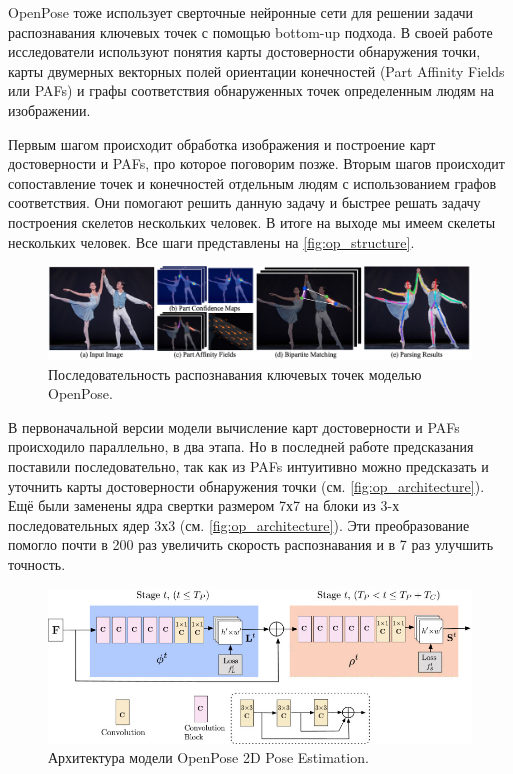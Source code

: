 OpenPose тоже использует сверточные нейронные сети для решении задачи распознавания ключевых точек с помощью bottom-up подхода. В своей работе исследователи используют понятия карты достоверности обнаружения точки, карты двумерных векторных полей ориентации конечностей (Part Affinity Fields или PAFs) и графы соответствия обнаруженных точек определенным людям на изображении.

Первым шагом происходит обработка изображения и построение карт достоверности и PAFs, про которое поговорим позже. Вторым шагов происходит сопоставление точек и конечностей отдельным людям с использованием графов соответствия. Они помогают решить данную задачу и быстрее решать задачу построения скелетов нескольких человек. В итоге на выходе мы имеем скелеты нескольких человек. Все шаги представлены на \autoref{fig:op_structure}.

\begin{figure}[t]
	\centering
	\includegraphics[width=\textwidth]{./images/OpenPose/structure}
	\caption{Последовательность распознавания ключевых точек моделью OpenPose. \cite{OpenPose}}
	\label{fig:op_structure}
\end{figure}

В первоначальной версии модели \cite{OpenPose_first} вычисление карт достоверности и PAFs происходило параллельно, в два этапа. Но в последней работе \cite{OpenPose} предсказания поставили последовательно, так как из PAFs интуитивно можно предсказать и уточнить карты достоверности обнаружения точки (см. \autoref{fig:op_architecture}). Ещё были заменены ядра свертки размером 7х7 на блоки из 3-х последовательных ядер 3х3 (см. \autoref{fig:op_architecture}). Эти преобразование помогло почти в 200 раз увеличить скорость распознавания и в 7 раз улучшить точность.

\begin{figure}[h]
	\centering
	\includegraphics[width=\textwidth * 4 / 5]{./images/OpenPose/architecture.jpg}
	\caption{Архитектура модели OpenPose 2D Pose Estimation. \cite{OpenPose}}
	\label{fig:op_architecture}
\end{figure}



